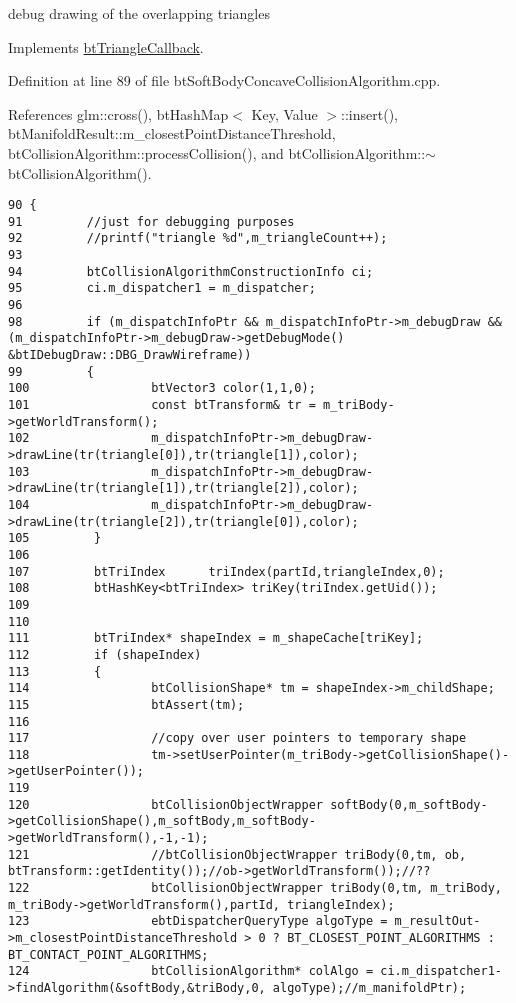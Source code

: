 debug drawing of the overlapping triangles 

Implements \hyperlink{classbt_triangle_callback}{btTriangleCallback}.

Definition at line 89 of file btSoftBodyConcaveCollisionAlgorithm.cpp.

References glm::cross(), btHashMap$<$ Key, Value $>$::insert(), btManifoldResult::m\_\-closestPointDistanceThreshold, btCollisionAlgorithm::processCollision(), and btCollisionAlgorithm::$\sim$btCollisionAlgorithm().

\begin{Code}\begin{verbatim}90 {
91         //just for debugging purposes
92         //printf("triangle %d",m_triangleCount++);
93         
94         btCollisionAlgorithmConstructionInfo ci;
95         ci.m_dispatcher1 = m_dispatcher;
96 
98         if (m_dispatchInfoPtr && m_dispatchInfoPtr->m_debugDraw && (m_dispatchInfoPtr->m_debugDraw->getDebugMode() &btIDebugDraw::DBG_DrawWireframe))
99         {
100                 btVector3 color(1,1,0);
101                 const btTransform& tr = m_triBody->getWorldTransform();
102                 m_dispatchInfoPtr->m_debugDraw->drawLine(tr(triangle[0]),tr(triangle[1]),color);
103                 m_dispatchInfoPtr->m_debugDraw->drawLine(tr(triangle[1]),tr(triangle[2]),color);
104                 m_dispatchInfoPtr->m_debugDraw->drawLine(tr(triangle[2]),tr(triangle[0]),color);
105         }
106 
107         btTriIndex      triIndex(partId,triangleIndex,0);
108         btHashKey<btTriIndex> triKey(triIndex.getUid());
109 
110 
111         btTriIndex* shapeIndex = m_shapeCache[triKey];
112         if (shapeIndex)
113         {
114                 btCollisionShape* tm = shapeIndex->m_childShape;
115                 btAssert(tm);
116 
117                 //copy over user pointers to temporary shape
118                 tm->setUserPointer(m_triBody->getCollisionShape()->getUserPointer());
119 
120                 btCollisionObjectWrapper softBody(0,m_softBody->getCollisionShape(),m_softBody,m_softBody->getWorldTransform(),-1,-1);
121                 //btCollisionObjectWrapper triBody(0,tm, ob, btTransform::getIdentity());//ob->getWorldTransform());//??
122                 btCollisionObjectWrapper triBody(0,tm, m_triBody, m_triBody->getWorldTransform(),partId, triangleIndex);
123                 ebtDispatcherQueryType algoType = m_resultOut->m_closestPointDistanceThreshold > 0 ? BT_CLOSEST_POINT_ALGORITHMS : BT_CONTACT_POINT_ALGORITHMS;
124                 btCollisionAlgorithm* colAlgo = ci.m_dispatcher1->findAlgorithm(&softBody,&triBody,0, algoType);//m_manifoldPtr);

\end{verbatim}
\end{Code}
